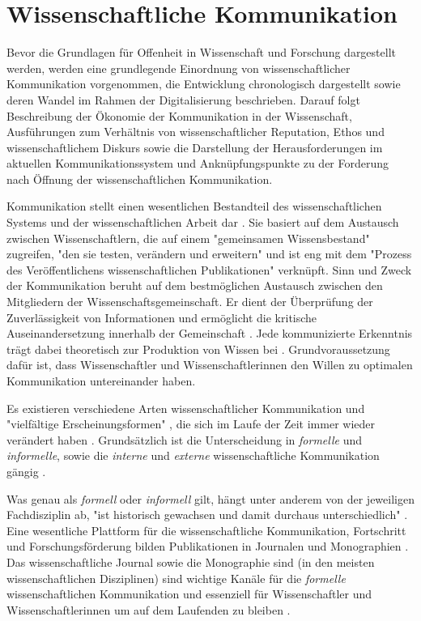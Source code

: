 \section{Wissenschaftliche Kommunikation}

Bevor die Grundlagen für Offenheit in Wissenschaft und Forschung dargestellt werden, werden eine grundlegende Einordnung von wissenschaftlicher Kommunikation vorgenommen, die Entwicklung chronologisch dargestellt sowie deren Wandel im Rahmen der Digitalisierung beschrieben. Darauf folgt Beschreibung der Ökonomie der Kommunikation in der Wissenschaft, Ausführungen zum Verhältnis von wissenschaftlicher Reputation, Ethos und wissenschaftlichem Diskurs sowie die Darstellung der Herausforderungen im aktuellen Kommunikationssystem und Anknüpfungspunkte zu der Forderung nach Öffnung der wissenschaftlichen Kommunikation.

Kommunikation stellt einen wesentlichen Bestandteil des wissenschaftlichen Systems und der wissenschaftlichen Arbeit dar \cite{garvey_2014_communication} \cite[:63]{Luhmann1998}. Sie basiert auf dem Austausch zwischen Wissenschaftlern, die auf einem "gemeinsamen Wissensbestand" zugreifen, "den sie testen, verändern und erweitern" \cite{Gl_ser_2007} und ist eng mit dem "Prozess des Veröffentlichens wissenschaftlichen Publikationen" \cite{weller2011twitter} verknüpft. Sinn und Zweck der Kommunikation beruht auf dem bestmöglichen Austausch zwischen den Mitgliedern der Wissenschaftsgemeinschaft. Er dient der Überprüfung der Zuverlässigkeit von Informationen und ermöglicht die kritische Auseinandersetzung innerhalb der Gemeinschaft \cite{fox_1983_publication}. Jede kommunizierte Erkenntnis trägt dabei theoretisch zur Produktion von Wissen bei \cite{kaden_2009_library}. Grundvoraussetzung dafür ist, dass Wissenschaftler und Wissenschaftlerinnen den Willen zu optimalen Kommunikation untereinander haben.

Es existieren verschiedene Arten wissenschaftlicher Kommunikation und "vielfältige Erscheinungsformen" \cite{graefen2007_wissenschaftliche_artikel}, die sich im Laufe der Zeit immer wieder verändert haben \cite{Konneker_2013} \cite{hagner_2015_sache_buches}. Grundsätzlich ist die Unterscheidung in \textit{formelle} und \textit{informelle}, sowie die \textit{interne} und \textit{externe} wissenschaftliche Kommunikation gängig \cite{suchen}.

Was genau als \textit{formell} oder \textit{informell} gilt, hängt unter anderem von der jeweiligen Fachdisziplin ab, "ist historisch gewachsen und damit durchaus unterschiedlich" \cite{Hanekop_2014}. Eine wesentliche Plattform für die wissenschaftliche Kommunikation, Fortschritt und Forschungsförderung bilden Publikationen in Journalen und Monographien \cite{cope2014future} \cite{fox_1983_publication}. Das wissenschaftliche Journal sowie die Monographie sind (in den meisten wissenschaftlichen Disziplinen) sind wichtige Kanäle für die \textit{formelle} wissenschaftlichen Kommunikation und essenziell für Wissenschaftler und Wissenschaftlerinnen um auf dem Laufenden zu bleiben \cite{cope2014future}.

